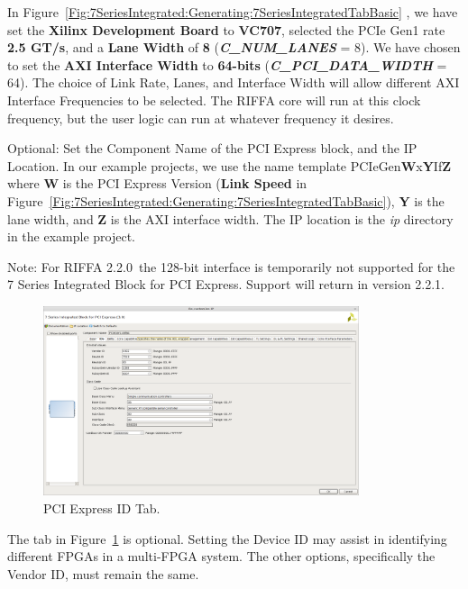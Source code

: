 \documentclass{refrep}
\newcommand{\RIFFAVer}{2.2.0}
\newcommand{\Directory}[1]{\textit{#1}}
\newcommand{\ConfigSetting}[1]{\textbf{#1}}
\newcommand{\RIFFAParameter}[1]{\textit{\textbf{#1}}}
\begin{document}
In Figure~\ref{Fig:7SeriesIntegrated:Generating:7SeriesIntegratedTabBasic} , we
have set the \ConfigSetting{Xilinx Development Board} to \ConfigSetting{VC707},
selected the PCIe Gen1 rate \ConfigSetting{2.5 GT/s}, and a \ConfigSetting{Lane
  Width} of \ConfigSetting{8} (\RIFFAParameter{C\_NUM\_LANES} = 8). We have
chosen to set the \ConfigSetting{AXI Interface Width} to \ConfigSetting{64-bits}
(\RIFFAParameter{C\_PCI\_DATA\_WIDTH} = 64). The choice of Link Rate, Lanes, and
Interface Width will allow different AXI Interface Frequencies to be
selected. The RIFFA core will run at this clock frequency, but the user logic
can run at whatever frequency it desires.

Optional: Set the Component Name of the PCI Express block, and the IP
Location. In our example projects, we use the name template
PCIeGen\textbf{W}x\textbf{Y}If\textbf{Z} where \textbf{W} is the PCI Express
Version (\ConfigSetting{Link Speed} in
Figure~\ref{Fig:7SeriesIntegrated:Generating:7SeriesIntegratedTabBasic}),
\textbf{Y} is the lane width, and \textbf{Z} is the AXI interface width.  The IP
location is the \Directory{ip} directory in the example project.

Note: For RIFFA \RIFFAVer~the 128-bit interface is temporarily not supported for
the 7 Series Integrated Block for PCI Express. Support will return in version 2.2.1.

\begin{figure}[H]
  \includegraphics[width=350px,center]{7SeriesIntegratedTabIDs.png}
  \caption{PCI Express ID Tab.}
  \label{Fig:7SeriesIntegrated:Generating:7SeriesIntegratedTabIDs}
\end{figure}
The tab in Figure~\ref{Fig:7SeriesIntegrated:Generating:7SeriesIntegratedTabIDs}
is optional. Setting the Device ID may assist in identifying different FPGAs in
a multi-FPGA system. The other options, specifically the Vendor ID, must remain
the same.
\end{document}
